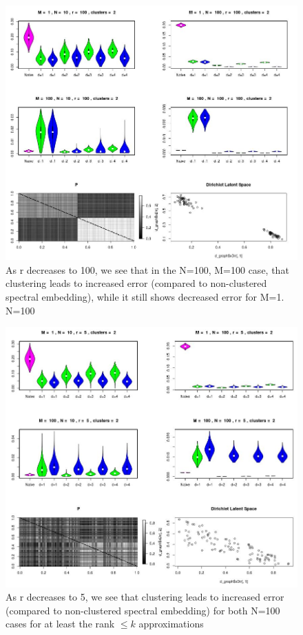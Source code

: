 \documentclass[11pt]{article}
\begin{document}
\newpage
\begin{figure}[!htb]
	\centering
	\includegraphics[width=18cm]{Capture2.jpg}
	\caption{As r decreases to 100, we see that in the N=100, M=100 case, that clustering leads to increased error (compared to non-clustered spectral embedding), while it still shows decreased error for M=1. N=100}
	\label{fig:plot1}
\end{figure}
\newpage
\begin{figure}[!htb]
	\centering
	\includegraphics[width=18cm]{Capture3.jpg}
	\caption{As r decreases to 5, we see that clustering leads to increased error (compared to non-clustered spectral embedding) for both N=100 cases for at least the rank $\leq k$ approximations}
	\label{fig:plot1}
\end{figure}
\end{document}
